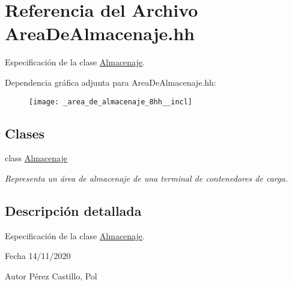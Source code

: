 \hypertarget{_area_de_almacenaje_8hh}{}\section{Referencia del Archivo Area\+De\+Almacenaje.\+hh}
\label{_area_de_almacenaje_8hh}


Especificación de la clase \hyperlink{class_almacenaje}{Almacenaje}.  


Dependencia gráfica adjunta para Area\+De\+Almacenaje.\+hh\+:\nopagebreak
\begin{figure}[H]
\begin{center}
\leavevmode
\texttt{[image: \_area\_de\_almacenaje\_8hh\_\_incl]}
\end{center}
\end{figure}
\subsection*{Clases}
\begin{DoxyCompactItemize}
\item 
class \hyperlink{class_almacenaje}{Almacenaje}
\begin{DoxyCompactList}\small\item\em Representa un área de almacenaje de una terminal de contenedores de carga. \end{DoxyCompactList}\end{DoxyCompactItemize}


\subsection{Descripción detallada}
Especificación de la clase \hyperlink{class_almacenaje}{Almacenaje}. 

\begin{DoxyDate}{Fecha}
14/11/2020 
\end{DoxyDate}
\begin{DoxyAuthor}{Autor}
Pérez Castillo, Pol 
\end{DoxyAuthor}
